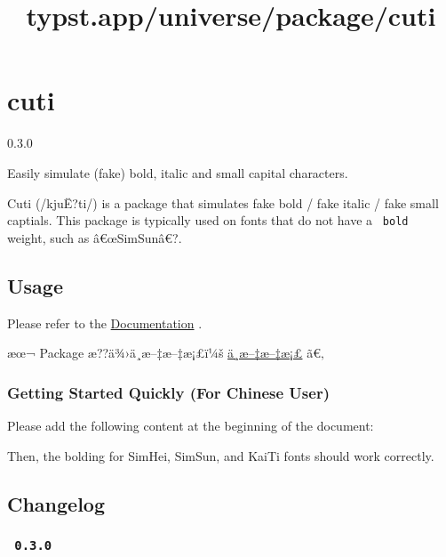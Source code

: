 \title{typst.app/universe/package/cuti}

\label{banner}
\section{cuti}\label{cuti}

{ 0.3.0 }

Easily simulate (fake) bold, italic and small capital characters.

\label{readme}
Cuti (/kjuË?ti/) is a package that simulates fake bold / fake italic /
fake small captials. This package is typically used on fonts that do not
have a \texttt{\ bold\ } weight, such as â€œSimSunâ€?.

\subsection{Usage}\label{usage}

Please refer to the
\href{https://csimide.github.io/cuti-docs/en/}{Documentation} .

æœ¬ Package æ??ä¾›ä¸­æ--‡æ--‡æ¡£ï¼š
\href{https://csimide.github.io/cuti-docs/zh-CN/}{ä¸­æ--‡æ--‡æ¡£} ã€‚

\subsubsection{Getting Started Quickly (For Chinese
User)}\label{getting-started-quickly-for-chinese-user}

Please add the following content at the beginning of the document:

\begin{Shaded}
\begin{Highlighting}[]
\end{Highlighting}
\end{Shaded}

Then, the bolding for SimHei, SimSun, and KaiTi fonts should work
correctly.

\subsection{Changelog}\label{changelog}

\subsubsection{\texorpdfstring{\texttt{\ 0.3.0\ }}{ 0.3.0 }}\label{section}

